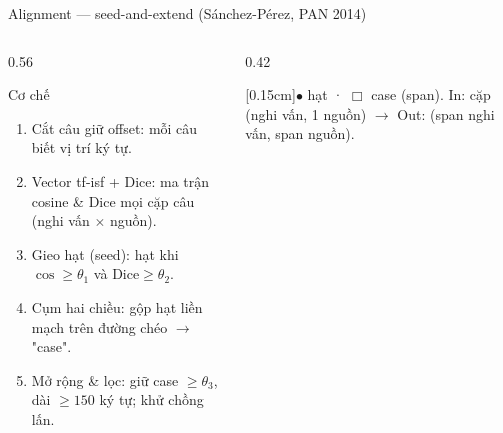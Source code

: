 \documentclass[aspectratio=169,11pt]{beamer}
\def\textbf#1{#1}%
\def\\{ }%
\begin{document}
\begin{frame}{Alignment — seed-and-extend (Sánchez-Pérez, PAN 2014)}
\begin{columns}[T]
\begin{column}{0.56\textwidth}
\begin{block}{Cơ chế}
\scriptsize
\begin{enumerate}\setlength\itemsep{1pt}
  \item \textbf{Cắt câu giữ offset:} mỗi câu biết vị trí ký tự.
  \item \textbf{Vector tf-isf + Dice:} ma trận cosine \& Dice mọi cặp câu (nghi vấn $\times$ nguồn).
  \item \textbf{Gieo hạt (seed):} hạt khi $\cos \ge \theta_1$ \textbf{và} $\mathrm{Dice} \ge \theta_2$.
  \item \textbf{Cụm hai chiều:} gộp hạt liền mạch trên đường chéo $\rightarrow$ "case".
  \item \textbf{Mở rộng \& lọc:} giữ case $\ge \theta_3$, dài $\ge 150$ ký tự; khử chồng lấn.
\end{enumerate}
\end{block}
\end{column}
\begin{column}{0.42\textwidth}
\centering
{}
\\[0.15cm]{\scriptsize \textcolor{primaryblue}{$\bullet$} hạt · \textcolor{accentorange}{$\Box$} case (span).\\ In: cặp (nghi vấn, 1 nguồn) $\rightarrow$ Out: (span nghi vấn, span nguồn).}
\end{column}
\end{columns}
\end{frame}
\end{document}
